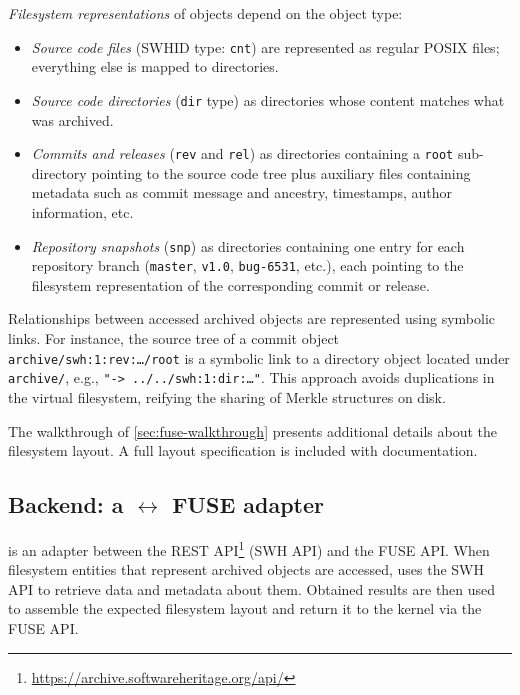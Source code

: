 \emph{Filesystem representations} of \SWH{} objects depend on the object type:
\begin{itemize}

\item \emph{Source code files} (SWHID type: \texttt{cnt}) are represented as
  regular POSIX files; everything else is mapped to directories.

\item \emph{Source code directories} (\texttt{dir} type) as directories whose
  content matches what was archived.

\item \emph{Commits and releases} (\texttt{rev} and \texttt{rel}) as
  directories containing a \texttt{root} sub-directory pointing to the source
  code tree plus auxiliary files containing metadata such as commit message and
  ancestry, timestamps, author information, etc.

\item \emph{Repository snapshots} (\texttt{snp}) as directories containing one
  entry for each repository branch (\texttt{master}, \texttt{v1.0},
  \texttt{bug-6531}, etc.), each pointing to the filesystem representation of
  the corresponding commit or release.

\end{itemize}

Relationships between accessed archived objects are represented using symbolic
links. For instance, the source tree of a commit object
\texttt{archive/swh:1:rev:…/root} is a symbolic link to a directory object
located under \texttt{archive/}, e.g., \texttt{"->~../../swh:1:dir:…"}. This
approach avoids duplications in the virtual filesystem, reifying the sharing of
Merkle structures on disk.

The walkthrough of \cref{sec:fuse-walkthrough} presents additional details
about the \SWHFS{} filesystem layout. A full layout specification is included
with \SWHFS{} documentation.


\subsection{Backend: a \SWH{} $\leftrightarrow$ FUSE adapter}

\SWHFSpy{} is an adapter between the \SWH{} REST
API\footnote{\url{https://archive.softwareheritage.org/api/}} (SWH API) and the
FUSE API\@. When filesystem entities that represent archived objects are
accessed, \SWHFSpy{} uses the SWH API to retrieve data and metadata about them.
Obtained results are then used to assemble the expected filesystem layout and
return it to the kernel via the FUSE API\@.

